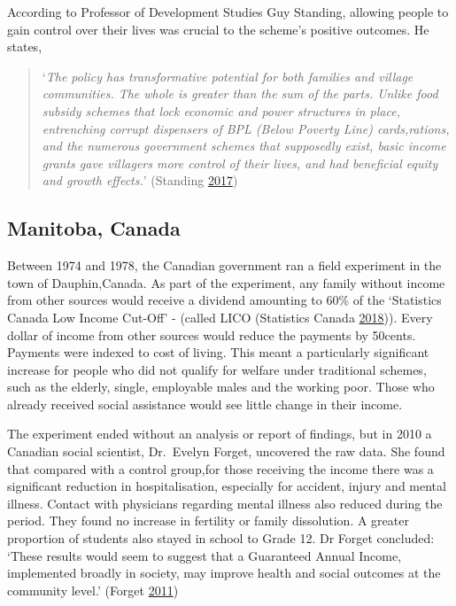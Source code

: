 \documentclass[]{tufte-handout}
\begin{document}
According to Professor of Development Studies Guy Standing, allowing
people to gain control over their lives was crucial to the scheme's
positive outcomes. He states,

\begin{quote}
`\emph{The policy has transformative potential for both families and
village communities. The whole is greater than the sum of the parts.
Unlike food subsidy schemes that lock economic and power structures in
place, entrenching corrupt dispensers of BPL (Below Poverty Line)
cards,rations, and the numerous government schemes that supposedly
exist, basic income grants gave villagers more control of their lives,
and had beneficial equity and growth effects.}' (Standing
\protect\hyperlink{ref-Standing2017}{2017})
\end{quote}

\hypertarget{manitoba-canada}{%
\subsection{Manitoba, Canada}\label{manitoba-canada}}

Between 1974 and 1978, the Canadian government ran a field experiment in
the town of Dauphin,Canada. As part of the experiment, any family
without income from other sources would receive a dividend amounting to
60\% of the `Statistics Canada Low Income Cut-Off' - (called LICO
(Statistics Canada \protect\hyperlink{ref-StatisticsCanada2018}{2018})).
Every dollar of income from other sources would reduce the payments by
50cents. Payments were indexed to cost of living. This meant a
particularly significant increase for people who did not qualify for
welfare under traditional schemes, such as the elderly, single,
employable males and the working poor. Those who already received social
assistance would see little change in their income.

The experiment ended without an analysis or report of findings, but in
2010 a Canadian social scientist, Dr.~Evelyn Forget, uncovered the raw
data. She found that compared with a control group,for those receiving
the income there was a significant reduction in hospitalisation,
especially for accident, injury and mental illness. Contact with
physicians regarding mental illness also reduced during the period. They
found no increase in fertility or family dissolution. A greater
proportion of students also stayed in school to Grade 12. Dr Forget
concluded: `These results would seem to suggest that a Guaranteed Annual
Income, implemented broadly in society, may improve health and social
outcomes at the community level.' (Forget
\protect\hyperlink{ref-Forget2011}{2011})
\end{document}
